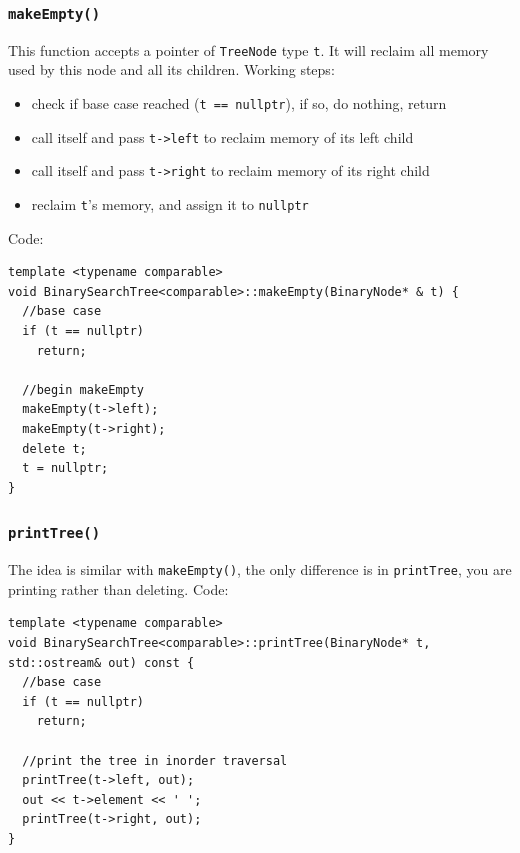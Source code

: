 \documentclass[11pt]{book}
\begin{document}
\subsubsection{\texttt{makeEmpty()}}
\label{sec:org0236142}
This function accepts a pointer of \texttt{TreeNode} type \texttt{t}. It will reclaim all memory used by this node and all its children. Working steps:
\begin{itemize}
\item check if base case reached (\texttt{t == nullptr}), if so, do nothing, return
\item call itself and pass \texttt{t->left} to reclaim memory of its left child
\item call itself and pass \texttt{t->right} to reclaim memory of its right child
\item reclaim \texttt{t}'s memory, and assign it to \texttt{nullptr}
\end{itemize}

Code:
\begin{verbatim}
template <typename comparable>
void BinarySearchTree<comparable>::makeEmpty(BinaryNode* & t) {
  //base case 
  if (t == nullptr)
    return;

  //begin makeEmpty
  makeEmpty(t->left);
  makeEmpty(t->right);
  delete t;
  t = nullptr;
}
\end{verbatim}

\subsubsection{\texttt{printTree()}}
\label{sec:orga36c71a}
The idea is similar with \texttt{makeEmpty()}, the only difference is in \texttt{printTree}, you are printing rather than deleting. Code:
\begin{verbatim}
template <typename comparable>
void BinarySearchTree<comparable>::printTree(BinaryNode* t, std::ostream& out) const {
  //base case 
  if (t == nullptr)
    return;

  //print the tree in inorder traversal
  printTree(t->left, out);
  out << t->element << ' ';
  printTree(t->right, out);
}
\end{verbatim}
\end{document}
